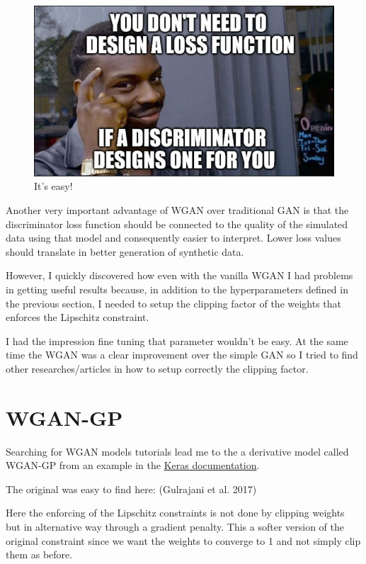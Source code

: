 \documentclass[
  letterpaper,
  DIV=11,
  numbers=noendperiod]{scrreprt}
\begin{document}
\begin{figure}

{\centering \includegraphics{no_loss.PNG}

}

\caption{It's easy!}

\end{figure}

Another very important advantage of WGAN over traditional GAN is that
the discriminator loss function should be connected to the quality of
the simulated data using that model and consequently easier to
interpret. Lower loss values should translate in better generation of
synthetic data.

However, I quickly discovered how even with the vanilla WGAN I had
problems in getting useful results because, in addition to the
hyperparameters defined in the previous section, I needed to setup the
clipping factor of the weights that enforces the Lipschitz constraint.

I had the impression fine tuning that parameter wouldn't be easy. At the
same time the WGAN was a clear improvement over the simple GAN so I
tried to find other researches/articles in how to setup correctly the
clipping factor.

\hypertarget{wgan-gp}{%
\chapter{WGAN-GP}\label{wgan-gp}}

Searching for WGAN models tutorials lead me to the a derivative model
called WGAN-GP from an example in the
\href{https://keras.io/examples/generative/wgan_gp/}{Keras
documentation}.

The original was easy to find here: (Gulrajani et al. 2017)

Here the enforcing of the Lipschitz constraints is not done by clipping
weights but in alternative way through a gradient penalty. This a softer
version of the original constraint since we want the weights to converge
to 1 and not simply clip them as before.
\end{document}
